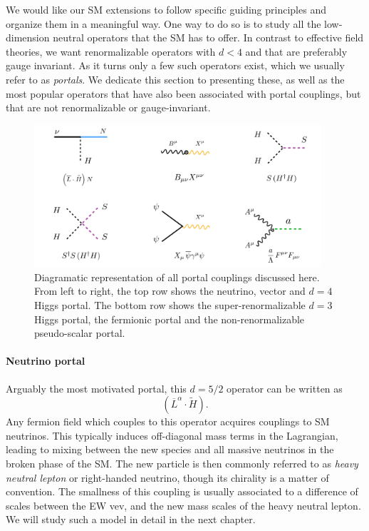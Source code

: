 We would like our SM extensions to follow specific guiding principles and organize them in a meaningful way. One way to do so is to study all the low-dimension neutral operators that the SM has to offer. In contrast to effective field theories, we want renormalizable operators with $d<4$ and that are preferably gauge invariant. As it turns only a few such operators exist, which we usually refer to as \emph{portals}. We dedicate this section to presenting these, as well as the most popular operators that have also been associated with portal couplings, but that are not renormalizable or gauge-invariant.
%
\begin{figure}[t]
 \includegraphics[width=0.95\textwidth]{Dark_portals.pdf}
 \caption[Diagramatic representation of the portal couplings discussed.]{Diagramatic representation of all portal couplings discussed here. From left to right, the top row shows the neutrino, vector and $d=4$ Higgs portal. The bottom row shows the super-renormalizable $d=3$ Higgs portal, the fermionic portal and the non-renormalizable pseudo-scalar portal. \label{fig:all_portals}}
\end{figure}
%

\paragraph{Neutrino portal} Arguably the most motivated portal, this $d=5/2$ operator can be written as
\begin{equation}
\left( \overline{L}^\alpha \cdot \tilde{H}\right).%
\end{equation}
%
Any fermion field which couples to this operator acquires couplings to SM neutrinos. This typically induces off-diagonal mass terms in the Lagrangian, leading to mixing between the new species and all massive neutrinos in the broken phase of the SM. The new particle is then commonly referred to as \emph{heavy neutral lepton} or right-handed neutrino, though its chirality is a matter of convention. The smallness of this coupling is usually associated to a difference of scales between the EW vev, and the new mass scales of the heavy neutral lepton. We will study such a model in detail in the next chapter.

